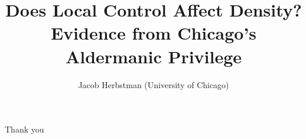 \documentclass[11pt,notes=hide,aspectratio=169,mathserif]{beamer}
\title[Aldermanic Privilege]{Does Local Control Affect Density? Evidence from Chicago's Aldermanic Privilege}
\author[Jacob Herbstman]{Jacob Herbstman (University of Chicago)}
\date{\monthname[\the\month] \the\year}
\begin{document}
\begin{frame}[plain]
\titlepage
\note{
	\begin{itemize}
	\end{itemize}
}
\end{frame}





\begin{frame}[plain]
    \begin{center}{\LARGE Thank you}\end{center}
    \end{frame}

\begin{frame}[allowframebreaks]{}
    
    
\end{frame}





\appendix
%

%
\end{document}
